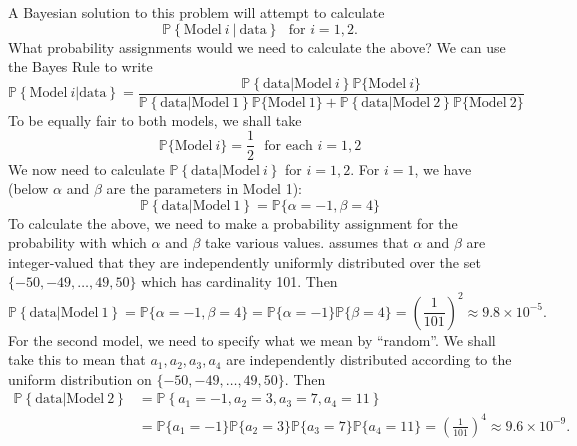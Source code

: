 \documentclass{scrartcl}
\renewcommand{\P}{{\mathbb P}}
\begin{document}
A Bayesian solution to this problem will attempt to calculate
\begin{equation*}
  \P \left\{\text{Model}~ i~ |~ \text{data}  \right\}  ~~~\text{for $i = 1,
    2$}. 
\end{equation*}
What probability assignments would we need to calculate the above? We
can use the Bayes Rule to write
\begin{equation}\label{br_mackay}
  \P \left\{\text{Model}~ i | \text{data}  \right\}  = \frac{\P
    \left\{\text{data} | \text{Model}~i \right\} \P\{\text{Model}~i\}}{\P
    \left\{\text{data} | \text{Model}~1 \right\} \P\{\text{Model}~1\}
    + \P
    \left\{\text{data} | \text{Model}~2 \right\} \P\{\text{Model}~2\}} 
\end{equation}
To be equally fair to both models, we shall take
\begin{equation}\label{prior_mackay}
  \P \{\text{Model}~i\} = \frac{1}{2} ~~~\text{for each $i = 1, 2$}
\end{equation}
We now need to calculate $\P \left\{\text{data} | \text{Model}~i
\right\}$ for $i = 1, 2$. For $i = 1$, we have (below $\alpha$ and
$\beta$ are the parameters in Model 1): 
\begin{equation*}
  \P \left\{\text{data} | \text{Model}~1
\right\} = \P\{\alpha = -1, \beta = 4\} 
\end{equation*}
To calculate the above, we need to make a probability assignment for
the probability with which $\alpha$  and $\beta$ take various
values. \citet[Chapter 28]{MacKay} assumes that $\alpha$ and
$\beta$ are integer-valued 
that they are independently uniformly distributed over the set $\{-50, -49, \dots,
49, 50\}$ which has cardinality 101. Then
\begin{equation}\label{mod1_mackay}
\P \left\{\text{data} | \text{Model}~1
\right\} =  \P\{\alpha = -1, \beta = 4\} = \P\{\alpha = -1\} \P\{\beta = 4\} =
  \left(\frac{1}{101} \right)^2 \approx 9.8 \times 10^{-5}. 
\end{equation}
For the second model, we need to specify what we mean by
``random''. We shall take this to mean that $a_1, a_2, a_3, a_4$ are
independently distributed according to the uniform distribution on
$\{-50, -49, \dots, 49, 50\}$. Then 
\begin{align*}
  \P \left\{\text{data} | \text{Model}~2
  \right\} &= \P\left\{a_1 = -1, a_2 = 3, a_3 = 7, a_4 = 11\right\} \\
  &= \P\{a_1 = -1\} \P\{a_2 = 3\} \P\{a_3 = 7\} \P\{a_4 = 11\} =
    \left(\frac{1}{101} \right)^4 \approx 9.6 \times 10^{-9}. 
\end{align*}
\end{document}
